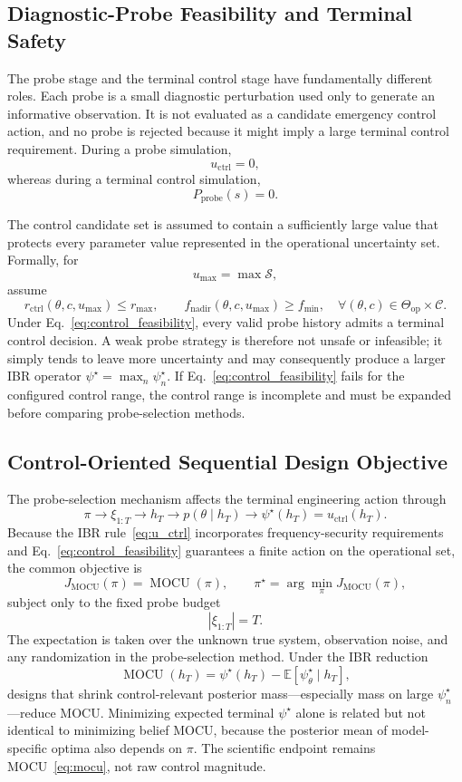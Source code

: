 \documentclass[11pt]{article}
\begin{document}
\subsection{Diagnostic-Probe Feasibility and Terminal Safety}

The probe stage and the terminal control stage have fundamentally different roles. Each probe is a small diagnostic perturbation used only to generate an informative observation. It is not evaluated as a candidate emergency control action, and no probe is rejected because it might imply a large terminal control requirement. During a probe simulation,
\[
u_{\mathrm{ctrl}}=0,
\]
whereas during a terminal control simulation,
\[
P_{\mathrm{probe}}(s)=0.
\]

The control candidate set is assumed to contain a sufficiently large value that protects every parameter value represented in the operational uncertainty set. Formally, for
\[
u_{\max}=\max\mathcal S,
\]
assume
\[
\boxed{
 r_{\mathrm{ctrl}}(\theta,c,u_{\max})\le r_{\max},
\qquad
 f_{\mathrm{nadir}}(\theta,c,u_{\max})\ge f_{\min},
\quad
 \forall(\theta,c)\in\Theta_{\mathrm{op}}\times\mathcal C.
}
\label{eq:control_feasibility}
\]
Under Eq.~\eqref{eq:control_feasibility}, every valid probe history admits a terminal control decision. A weak probe strategy is therefore not unsafe or infeasible; it simply tends to leave more uncertainty and may consequently produce a larger IBR operator \(\psi^\star=\max_n \psi_n^\star\). If Eq.~\eqref{eq:control_feasibility} fails for the configured control range, the control range is incomplete and must be expanded before comparing probe-selection methods.

\subsection{Control-Oriented Sequential Design Objective}

The probe-selection mechanism affects the terminal engineering action through
\[
\pi
\longrightarrow
\xi_{1:T}
\longrightarrow
h_T
\longrightarrow
p(\theta\mid h_T)
\longrightarrow
\psi^\star(h_T)
=
u_{\mathrm{ctrl}}(h_T).
\]
Because the IBR rule~\eqref{eq:u_ctrl} incorporates frequency-security
requirements and Eq.~\eqref{eq:control_feasibility} guarantees a finite action
on the operational set, the common objective is
\[
\boxed{
J_{\mathrm{MOCU}}(\pi)
=
\operatorname{MOCU}(\pi),
\qquad
\pi^\star=\arg\min_{\pi}J_{\mathrm{MOCU}}(\pi),
}
\label{eq:policy_objective}
\]
subject only to the fixed probe budget
\[
\boxed{
|\xi_{1:T}|=T.
}
\label{eq:fixed_budget}
\]
The expectation is taken over the unknown true system, observation noise, and
any randomization in the probe-selection method. Under the IBR reduction
\[
\operatorname{MOCU}(h_T)=\psi^\star(h_T)-\mathbb E[\psi_\theta^\star\mid h_T],
\]
designs that shrink control-relevant posterior mass---especially mass on large
\(\psi_n^\star\)---reduce MOCU. Minimizing expected terminal \(\psi^\star\) alone is
related but not identical to minimizing belief MOCU, because the posterior mean
of model-specific optima also depends on \(\pi\). The scientific endpoint remains
MOCU~\eqref{eq:mocu}, not raw control magnitude.
\end{document}
